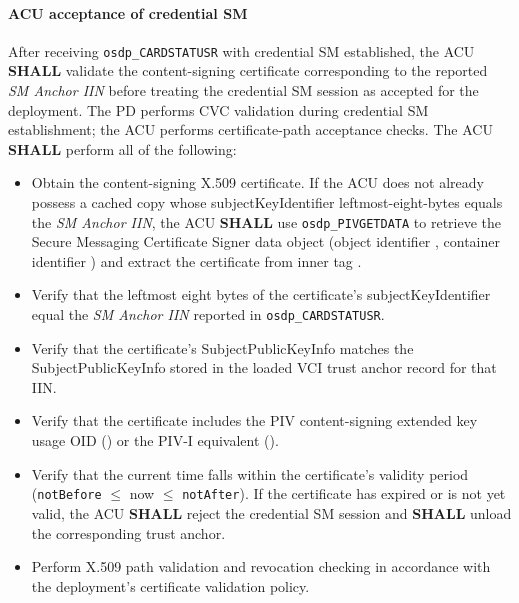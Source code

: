 \paragraph{ACU acceptance of credential SM}
After receiving \texttt{osdp\_CARDSTATUSR} with credential SM established, the ACU \textbf{SHALL} validate the content-signing certificate corresponding to the reported \emph{SM Anchor IIN} before treating the credential SM session as accepted for the deployment. The PD performs CVC validation during credential SM establishment; the ACU performs certificate-path acceptance checks. The ACU \textbf{SHALL} perform all of the following:
\begin{itemize}
  \item Obtain the content-signing X.509 certificate. If the ACU does not already possess a cached copy whose subjectKeyIdentifier leftmost-eight-bytes equals the \emph{SM Anchor IIN}, the ACU \textbf{SHALL} use \texttt{osdp\_PIVGETDATA} to retrieve the Secure Messaging Certificate Signer data object (object identifier , container identifier ) and extract the certificate from inner tag .
  \item Verify that the leftmost eight bytes of the certificate's subjectKeyIdentifier equal the \emph{SM Anchor IIN} reported in \texttt{osdp\_CARDSTATUSR}.
  \item Verify that the certificate's SubjectPublicKeyInfo matches the SubjectPublicKeyInfo stored in the loaded VCI trust anchor record for that IIN.
  \item Verify that the certificate includes the PIV content-signing extended key usage OID () or the PIV-I equivalent ().
  \item Verify that the current time falls within the certificate's validity period (\texttt{notBefore} $\leq$ now $\leq$ \texttt{notAfter}). If the certificate has expired or is not yet valid, the ACU \textbf{SHALL} reject the credential SM session and \textbf{SHALL} unload the corresponding trust anchor.
  \item Perform X.509 path validation and revocation checking in accordance with the deployment's certificate validation policy.
\end{itemize}

